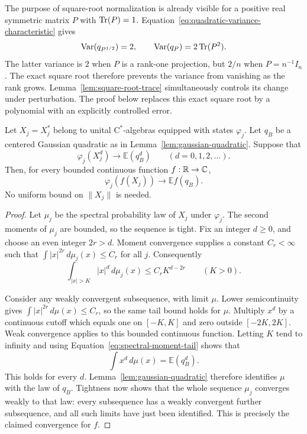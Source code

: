 The purpose of square-root normalization is already visible for a
positive real symmetric matrix \(P\) with \(\operatorname{Tr}(P)=1\).
Equation~\eqref{eq:quadratic-variance-characteristic} gives
\[
 \operatorname{Var}(q_{P^{1/2}})=2,
 \qquad
 \operatorname{Var}(q_P)=2\operatorname{Tr}(P^2).
\]
The latter variance is \(2\) when \(P\) is a rank-one projection,
but \(2/n\) when \(P=n^{-1}I_n\). The exact square root therefore
prevents the variance from vanishing as the rank grows.
Lemma~\ref{lem:square-root-trace} simultaneously controls its
change under perturbation. The proof below replaces this exact
square root by a polynomial with an explicitly controlled error.

\begin{lemma}\label{lem:quadratic-moment-transfer}
Let \(X_j=X_j^*\) belong to unital \(\mathrm{C}^*\)-algebras
equipped with states \(\varphi_j\). Let \(q_B\) be a centered
Gaussian quadratic as in Lemma~\ref{lem:gaussian-quadratic}.
Suppose that
\[
 \varphi_j(X_j^d)\longrightarrow\mathbb E(q_B^d)
 \qquad(d=0,1,2,\ldots).
\]
Then, for every bounded continuous function \(f:\mathbb R\to\mathbb C\),
\[
 \varphi_j(f(X_j))\longrightarrow\mathbb E f(q_B).
\]
No uniform bound on \(\|X_j\|\) is needed.
\end{lemma}

\begin{proof}
Let \(\mu_j\) be the spectral probability law of \(X_j\) under
\(\varphi_j\). The second moments of \(\mu_j\) are bounded, so
the sequence is tight. Fix an integer \(d\geq0\), and choose an
even integer \(2r>d\). Moment convergence supplies a constant
\(C_r<\infty\) such that
\(\int |x|^{2r}\,d\mu_j(x)\leq C_r\) for all \(j\). Consequently
\begin{equation}\label{eq:spectral-moment-tail}
 \int_{|x|>K}|x|^d\,d\mu_j(x)
 \leq C_r K^{d-2r}
 \qquad(K>0).
\end{equation}

Consider any weakly convergent subsequence, with limit \(\mu\).
Lower semicontinuity gives
\(\int |x|^{2r}\,d\mu(x)\leq C_r\), so the same tail bound holds
for \(\mu\). Multiply \(x^d\) by a continuous cutoff which equals
one on \([-K,K]\) and zero outside \([-2K,2K]\). Weak convergence
applies to this bounded continuous function. Letting \(K\) tend
to infinity and using Equation~\eqref{eq:spectral-moment-tail} shows that
\[
 \int x^d\,d\mu(x)=\mathbb E(q_B^d).
\]
This holds for every \(d\). Lemma~\ref{lem:gaussian-quadratic}
therefore identifies \(\mu\) with the law of \(q_B\).
Tightness now shows that the whole sequence \(\mu_j\) converges
weakly to that law: every subsequence has a weakly convergent
further subsequence, and all such limits have just been
identified. This is precisely the claimed convergence for \(f\).
\end{proof}

